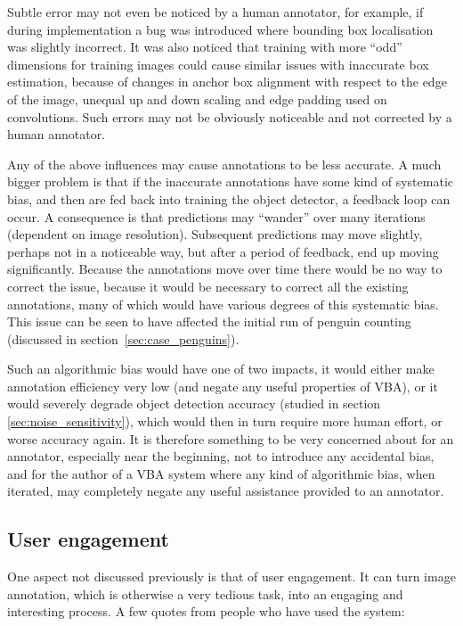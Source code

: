 Subtle error may not even be noticed by a human annotator, for example,  if during implementation a bug was introduced where bounding box localisation was slightly incorrect. It was also noticed that training with more ``odd'' dimensions for training images could cause similar issues with inaccurate box estimation, because of changes in anchor box alignment with respect to the edge of the image, unequal up and down scaling and edge padding used on convolutions. Such errors may not be obviously noticeable and not corrected by a human annotator.
 
Any of the above influences may cause annotations to be less accurate. A much bigger problem is that if the inaccurate annotations have some kind of systematic bias, and then are fed back into training the object detector, a feedback loop can occur. A consequence is that predictions may ``wander'' over many iterations (dependent on image resolution). Subsequent predictions may move slightly, perhaps not in a noticeable way, but after a period of feedback, end up moving significantly. Because the annotations move over time there would be no way to correct the issue, because it would be necessary to correct all the existing annotations, many of which would have various degrees of this systematic bias. This issue can be seen to have affected the initial run of penguin counting (discussed in section~\ref{sec:case_penguins}).  

Such an algorithmic bias would have one of two impacts, it would either make annotation efficiency very low (and negate any useful properties of \gls{VBA}), or it would severely degrade object detection accuracy (studied in section~ \ref{sec:noise_sensitivity}), which would then in turn require more human effort, or worse accuracy again. It is therefore something to be very concerned about for an annotator, especially near the beginning, not to introduce any accidental bias, and for the author of a \gls{VBA} system where any kind of algorithmic bias, when iterated, may completely negate any useful assistance provided to an annotator.


\subsection{User engagement}
\label{sec:engagement}

One aspect not discussed previously is that of user engagement. It can turn image annotation, which is otherwise a very tedious task, into an engaging and interesting process. A few quotes from people who have used the system:

